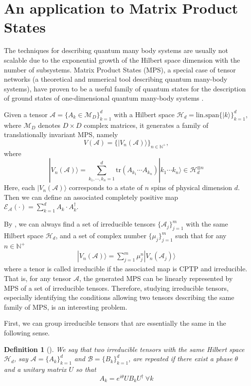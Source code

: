 \documentclass[journal]{IEEEtran}
\def\h{\ensuremath{\mathcal{H}}}
\def\a{\ensuremath{\mathcal{A}}}
\def\b{\ensuremath{\mathcal{B}}}
\def\e{\ensuremath{\mathcal{E}}}
\newtheorem{definition}{Definition}
\begin{document}
\section{An application to Matrix Product States}
The techniques for describing quantum many body systems are usually not scalable due to the exponential growth of the Hilbert space dimension with the number of subsystems.  Matrix Product States (MPS), a special case of tensor networks (a theoretical and numerical tool describing quantum many-body systems), have proven to be a useful family of quantum states for the description of  ground states of  one-dimensional quantum many-body systems \cite{cirac2017matrix}.  

Given a  tensor $\a=\{A_{k}\in \mathcal{M}_D\}_{k=1}^{d}$ with a Hilbert space $\h_d=\textrm{lin.span}\{|k\rangle\}_{k=1}^{d}$, where $\mathcal{M}_{D}$ denotes $D\times D$ complex matrices, it generates a family of translationally invariant MPS, namely
$$V(\a)=\{|V_{n}(\a)\rangle\}_{n\in \mathbb{N^+}},$$
where $$|V_{n}(\a)\rangle=\sum_{k_1,\cdots,k_n=1}^{d}\textrm{tr}(A_{k_1}\cdots A_{k_n})|k_1\cdots k_{n}\rangle\in\h_d^{\otimes n}$$
Here, each $|V_{n}(\a)\rangle$ corresponds to a state of $n$ spins of physical dimension $d.$
Then we can define an associated completely positive map $\e_\a(\cdot)=\sum_{k=1}^{d}A_{k}\cdot A_{k}^\dagger$.


By \cite{cuevas2017irreducible}, we can always find a set of irreducible tensors $\{\a_{j}\}_{j=1}^{m}$ with the same Hilbert space  $\h_d$, and a set of complex number $\{\mu_{j}\}_{j=1}^{m}$ such that for any $n\in\mathbb{N^{+}}$
\begin{eqnarray}\label{Eq_MPS}
  |V_n(\a)\rangle=\sum_{j=1}^{m}\mu_j^{n}|V_n(\a_{j})\rangle
\end{eqnarray}
where a tenor is called irreducible if the associated map is CPTP and irreducible. That is, for any tensor $\a$,  the generated MPS can be linearly represented by MPS of a set of irreducible tensors. Therefore, studying irreducible tensors, especially identifying the conditions allowing two tensors describing the same family of
MPS, is an interesting problem. 

First, we can group irreducible tensors that are essentially the same in the following sense.
\begin{definition}[\cite{cuevas2017irreducible}]
  We say that two irreducible tensors with the same Hilbert space  $\h_d$, say $\a=\{A_{k}\}_{k=1}^{d}$ and $\b=\{B_{k}\}_{k=1}^{d}$, are repeated if there exist a phase $\theta$ and a unitary matrix $U$ so that 
  $$A_{k}=e^{i\theta}UB_kU^\dagger \ \forall k$$
\end{definition}
\end{document}

